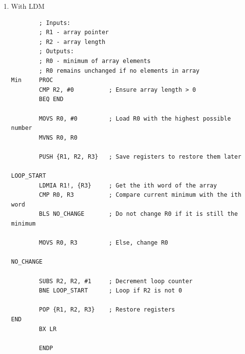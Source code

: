 \documentclass{article}
\begin{document}
\begin{enumerate}
\begin{enumerate}
\begin{verbatim}
        PUSH {R1, R2, R3}   ; Save registers to restore them later

LOOP_START
        LDR R3, [R1, #0]    ; Get the ith word of the array
        CMP R0, R3          ; Compare current minimum with the ith word
        BLS NO_CHANGE       ; Do not change R0 if it is still the minimum

        MOVS R0, R3         ; Else, change R0

NO_CHANGE
        ADDS R1, R1, #4     ; Increment array pointer

        SUBS R2, R2, #1     ; Decrement loop counter
        BNE LOOP_START      ; Loop if R2 is not 0

        POP {R1, R2, R3}    ; Restore registers
END
        BX LR

        ENDP
\end{verbatim}
		      \item With LDM
		            \begin{verbatim}
        ; Inputs:
        ; R1 - array pointer
        ; R2 - array length
        ; Outputs:
        ; R0 - minimum of array elements
        ; R0 remains unchanged if no elements in array
Min     PROC
        CMP R2, #0          ; Ensure array length > 0
        BEQ END

        MOVS R0, #0         ; Load R0 with the highest possible number
        MVNS R0, R0
        
        PUSH {R1, R2, R3}   ; Save registers to restore them later

LOOP_START
        LDMIA R1!, {R3}     ; Get the ith word of the array
        CMP R0, R3          ; Compare current minimum with the ith word
        BLS NO_CHANGE       ; Do not change R0 if it is still the minimum

        MOVS R0, R3         ; Else, change R0

NO_CHANGE

        SUBS R2, R2, #1     ; Decrement loop counter
        BNE LOOP_START      ; Loop if R2 is not 0

        POP {R1, R2, R3}    ; Restore registers
END
        BX LR

        ENDP
\end{verbatim}
	      \end{enumerate}
\end{enumerate}
\end{document}
